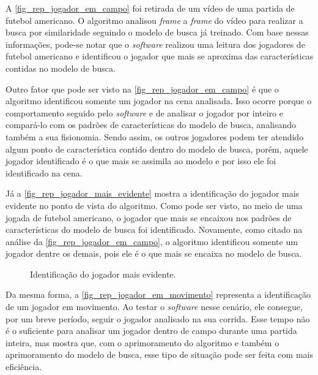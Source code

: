A \autoref{fig_rep_jogador_em_campo} foi retirada de um vídeo de uma partida de futebol americano. O algoritmo analisou \textit{frame} a \textit{frame} do vídeo para realizar a busca por similaridade seguindo o modelo de busca já treinado. Com base nessas informações, pode-se notar que o \textit{software} realizou uma leitura dos jogadores de futebol americano e identificou o jogador que mais se aproxima das características contidas no modelo de busca.

Outro fator que pode ser visto na \autoref{fig_rep_jogador_em_campo} é que o algoritmo identificou somente um jogador na cena analisada. Isso ocorre porque o comportamento seguido pelo \textit{software} e de analisar o jogador por inteiro e compará-lo com os padrões de características do modelo de busca, analisando também a sua fisionomia. Sendo assim, os outros jogadores podem ter atendido algum ponto de característica contido dentro do modelo de busca, porém, aquele jogador identificado é o que mais se assimila ao modelo e por isso ele foi identificado na cena.

Já a \autoref{fig_rep_jogador_mais_evidente} mostra a identificação do jogador mais evidente no ponto de vista do algoritmo. Como pode ser visto, no meio de uma jogada de futebol americano, o jogador que mais se encaixou nos padrões de características do modelo de busca foi identificado. Novamente, como citado na análise da \autoref{fig_rep_jogador_em_campo}, o algoritmo identificou somente um jogador dentre os demais, pois ele é o que mais se encaixa no modelo de busca.

\begin{figure}[ht]
	\caption{\label{fig_rep_jogador_mais_evidente}Identificação do jogador mais evidente.}
	\begin{center}
	\end{center}
	\centering {}
\end{figure}

Da mesma forma, a \autoref{fig_rep_jogador_em_movimento} representa a identificação de um jogador em movimento. Ao testar o \textit{software} nesse cenário, ele consegue, por um breve período, seguir o jogador analisado na sua corrida. Esse tempo não é o suficiente para analisar um jogador dentro de campo durante uma partida inteira, mas mostra que, com o aprimoramento do algoritmo e também o aprimoramento do modelo de busca, esse tipo de situação pode ser feita com mais eficiência.

